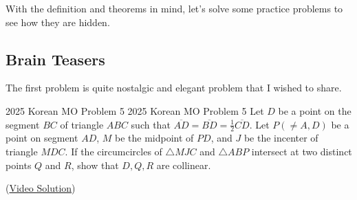 \documentclass[../../main.tex]{subfiles}
\begin{document}
With the definition and theorems in mind, let's solve some practice
problems to see how they are hidden.

\subsection{Brain Teasers}

The first problem is quite nostalgic and elegant problem that I
wished to share.

\begin{problem}
{2025 Korean MO Problem 5 \easy}
{2025 Korean MO Problem 5}
Let $D$ be a point on the segment $BC$ of triangle $ABC$ such that
$\overline{AD} = \overline{BD} = \frac{1}{2} \overline{CD}$. Let
$P (\neq A, D)$ be a point on segment $AD$, $M$ be the midpoint
of $PD$, and $J$ be the incenter of triangle $MDC$. If the
circumcircles of $\triangle{MJC}$ and $\triangle{ABP}$ intersect
at two distinct points $Q$ and $R$, show that $D, Q, R$ are collinear.
\end{problem}
(\href{https://youtu.be/BwEyAtgzZEE}{Video Solution})
\end{document}
